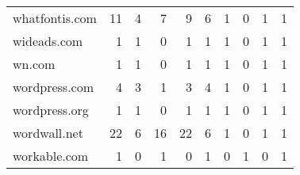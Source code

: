 \begin{tabular}{lrrrrrrrrr}
             whatfontis.com &                               11 &                                  4 &                                      7 &                            9 &                           6 &                                   1 &                                      0 &                             1 &                            1 \\
                wideads.com &                                1 &                                  1 &                                      0 &                            1 &                           1 &                                   1 &                                      0 &                             1 &                            1 \\
                     wn.com &                                1 &                                  1 &                                      0 &                            1 &                           1 &                                   1 &                                      0 &                             1 &                            1 \\
              wordpress.com &                                4 &                                  3 &                                      1 &                            3 &                           4 &                                   1 &                                      0 &                             1 &                            1 \\
              wordpress.org &                                1 &                                  1 &                                      0 &                            1 &                           1 &                                   1 &                                      0 &                             1 &                            1 \\
               wordwall.net &                               22 &                                  6 &                                     16 &                           22 &                           6 &                                   1 &                                      0 &                             1 &                            1 \\
               workable.com &                                1 &                                  0 &                                      1 &                            0 &                           1 &                                   0 &                                      1 &                             0 &                            1 \\

\end{tabular}
